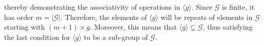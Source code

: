 \documentclass{article}[12]
\numberwithin{equation}{section}
\begin{document}
\begin{flushleft}
thereby demonstrating the associativity of operations in $\langle g \rangle$.  Since $\mathcal{G}$ is finite, it has order $m = \lvert \mathcal{G} \rvert$.  Therefore, the elements of $\langle g \rangle$ will be repeats of elements in $\mathcal{G}$ starting with $\left(m+1\right) \times g$.  Moreover, this means that $\langle g \rangle \subseteq \mathcal{G}$, thus satisfying the last condition for $\langle g \rangle$ to be a sub-group of $\mathcal{G}$.

















































\end{flushleft}
\end{document}
